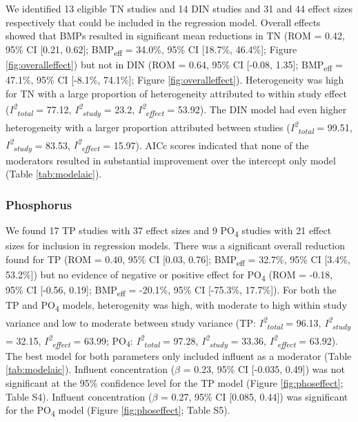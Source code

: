 \documentclass[utf8]{FrontiersinHarvard}
\begin{document}
We identified 13 eligible TN studies and 14 DIN studies and 31 and 44 effect sizes respectively that could be included in the regression model.
Overall effects showed that BMPs resulted in significant mean reductions in TN (ROM = 0.42, 95\% CI {[}0.21, 0.62{]}; BMP\textsubscript{eff} = 34.0\%, 95\% CI {[}18.7\%, 46.4\%{]}; Figure \ref{fig:overalleffect}) but not in DIN (ROM = 0.64, 95\% CI {[}-0.08, 1.35{]}; BMP\textsubscript{eff} = 47.1\%, 95\% CI {[}-8.1\%, 74.1\%{]}; Figure \ref{fig:overalleffect}).
Heterogeneity was high for TN with a large proportion of heterogeneity attributed to within study effect (\textit{I\textsuperscript{2}\textsubscript{total}} = 77.12, \textit{I\textsuperscript{2}\textsubscript{study}} = 23.2, \textit{I\textsuperscript{2}\textsubscript{effect}} = 53.92).
The DIN model had even higher heterogeneity with a larger proportion attributed between studies (\textit{I\textsuperscript{2}\textsubscript{total}} = 99.51, \textit{I\textsuperscript{2}\textsubscript{study}} = 83.53, \textit{I\textsuperscript{2}\textsubscript{effect}} = 15.97).
AICc scores indicated that none of the moderators resulted in substantial improvement over the intercept only model (Table \ref{tab:modelaic}).

\hypertarget{phosphorus}{%
\subsubsection{Phosphorus}\label{phosphorus}}

We found 17 TP studies with 37 effect sizes and 9 PO\textsubscript{4} studies with 21 effect sizes for inclusion in regression models.
There was a significant overall reduction found for TP (ROM = 0.40, 95\% CI {[}0.03, 0.76{]}; BMP\textsubscript{eff} = 32.7\%, 95\% CI {[}3.4\%, 53.2\%{]}) but no evidence of negative or positive effect for PO\textsubscript{4} (ROM = -0.18, 95\% CI {[}-0.56, 0.19{]}; BMP\textsubscript{eff} = -20.1\%, 95\% CI {[}-75.3\%, 17.7\%{]}).
For both the TP and PO\textsubscript{4} models, heterogenity was high, with moderate to high within study variance and low to moderate between study variance (TP: \textit{I\textsuperscript{2}\textsubscript{total}} = 96.13, \textit{I\textsuperscript{2}\textsubscript{study}} = 32.15, \textit{I\textsuperscript{2}\textsubscript{effect}} = 63.99; PO\textsubscript{4}: \textit{I\textsuperscript{2}\textsubscript{total}} = 97.28, \textit{I\textsuperscript{2}\textsubscript{study}} = 33.36, \textit{I\textsuperscript{2}\textsubscript{effect}} = 63.92).
The best model for both parameters only included influent as a moderator (Table \ref{tab:modelaic}).
Influent concentration (\(\beta\) = 0.23, 95\% CI {[}-0.035, 0.49{]}) was not significant at the 95\% confidence level for the TP model (Figure \ref{fig:phoseffect}; Table S4).
Influent concentration (\(\beta\) = 0.27, 95\% CI {[}0.085, 0.44{]}) was significant for the PO\textsubscript{4} model (Figure \ref{fig:phoseffect}; Table S5).
\end{document}
